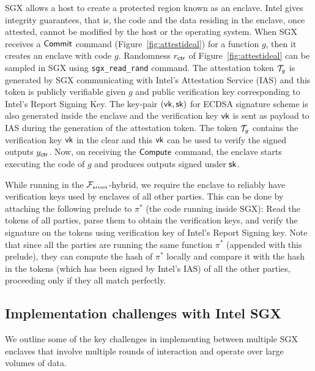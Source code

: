 SGX allows a host to create a protected region known as an enclave. Intel gives integrity guarantees, that is, the code and the data residing in the enclave, once attested, cannot be modified by the host or the operating system. 
When SGX receives a $\mathsf{Commit}$ command (Figure~\ref{fig:attestideal}) for a function $g$, then it creates an enclave with code $g$.
Randomness $r_{\mathsf{ctr}}$ of Figure~\ref{fig:attestideal} can be sampled in SGX using {\tt sgx\_read\_rand} command. 
The attestation token $\mathcal{T}_g$ is generated by SGX communicating with Intel's Attestation Service (IAS) and this token is publicly verifiable given $g$ and  public verification key corresponding to Intel's Report Signing Key.
The key-pair $(\mathsf{vk},\mathsf{sk})$ for ECDSA signature scheme is also generated inside the enclave and the verification key $\mathsf{vk}$ is sent as payload to IAS during the generation of the attestation token. 
The token $\mathcal{T}_g$ contains the verification key $\mathsf{vk}$ in the clear and this $\mathsf{vk}$ can be used to verify the signed outputs $y_{\mathsf{ctr}}$.
Now, on receiving the $\mathsf{Compute}$ command, the enclave starts executing the code of $g$ and produces outputs signed under $\mathsf{sk}$.

While running \mpc in the $\mathcal{F}_{\textrm{\tiny{attest}}}$-hybrid, we require the enclave to reliably have verification keys used by enclaves of all other parties. This can be done by attaching the following prelude to $\pi^*$ (the code running inside SGX): Read the tokens of all parties, parse them to obtain the verification keys, and verify the signature on the tokens using verification key of Intel's Report Signing key. Note that since all the parties are running the same function $\pi^*$ (appended with this prelude), they can compute the hash of $\pi^*$ locally and compare it with the hash in the tokens (which has been signed by Intel's IAS) of all the other parties, proceeding only if they all match perfectly.

\subsection{Implementation challenges with Intel SGX}
\label{sec:challenges-aramis}


We outline some of the key challenges in implementing \mpc between multiple SGX enclaves that involve multiple rounds of interaction and operate over large volumes of data.

